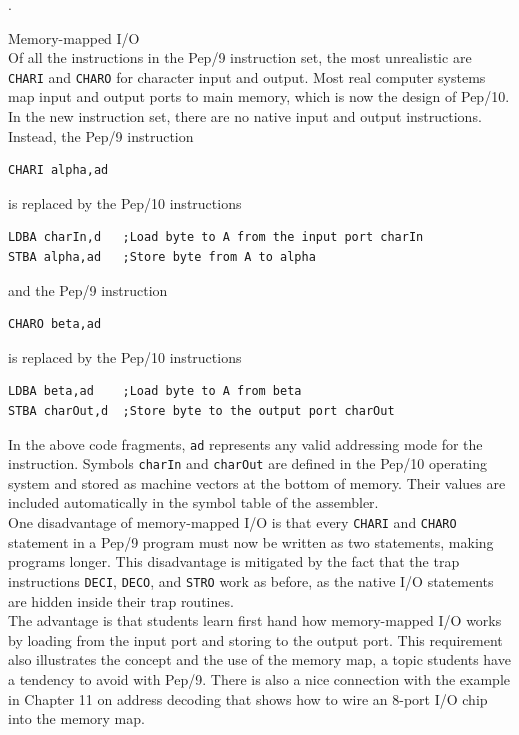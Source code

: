 \documentclass[10pt,fleqn]{book}
\newenvironment{exercises}
   {\begin{list}
      {\arabic{ecounter}.}
      {
         \usecounter{ecounter}
         \setcounter {ecounter}{0}
         \setlength\leftmargin{2pc}
         \setlength\labelwidth{6pc}
         \setlength\labelsep{1pc}
      }}
   {\end{list}}
\newcounter{ecounter}
\begin{document}
\begin{exercises}
\item Memory-mapped I/O\\[6pt]
Of all the instructions in the Pep/9 instruction set, the most unrealistic are \verb|CHARI| and \verb|CHARO| for character input and output.
Most real computer systems map input and output ports to main memory, which is now the design of Pep/10.
In the new instruction set, there are no native input and output instructions.
Instead, the Pep/9 instruction
\begin{verbatim}
CHARI alpha,ad
\end{verbatim}
is replaced by the Pep/10 instructions
\begin{verbatim}
LDBA charIn,d   ;Load byte to A from the input port charIn
STBA alpha,ad   ;Store byte from A to alpha
\end{verbatim}
and the Pep/9 instruction
\begin{verbatim}
CHARO beta,ad
\end{verbatim}
is replaced by the Pep/10 instructions
\begin{verbatim}
LDBA beta,ad    ;Load byte to A from beta
STBA charOut,d  ;Store byte to the output port charOut
\end{verbatim}
In the above code fragments, \verb|ad| represents any valid addressing mode for the instruction.
Symbols \verb|charIn| and \verb|charOut| are defined in the Pep/10 operating system and stored as machine vectors at the bottom of memory.
Their values are included automatically in the symbol table of the assembler.\\[6pt]
One disadvantage of memory-mapped I/O is that every \verb|CHARI| and \verb|CHARO| statement in a Pep/9 program must now be written as two statements, making programs longer.
This disadvantage is mitigated by the fact that the trap instructions \verb|DECI|, \verb|DECO|, and \verb|STRO| work as before, as the native I/O statements are hidden inside their trap routines.\\[6pt]
The advantage is that students learn first hand how memory-mapped I/O works by loading from the input port and storing to the output port.
This requirement also illustrates the concept and the use of the memory map, a topic students have a tendency to avoid with Pep/9.
There is also a nice connection with the example in Chapter 11 on address decoding that shows how to wire an 8-port I/O chip into the memory map.


\end{exercises}
\end{document}

